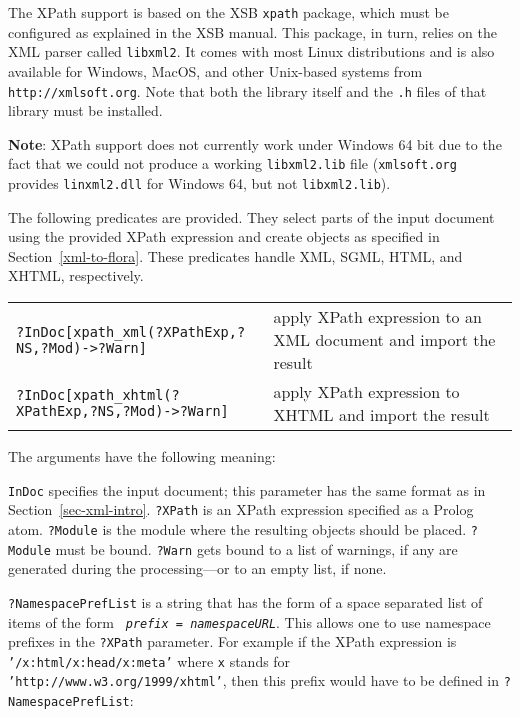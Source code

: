 The XPath support is based on the XSB {\tt xpath} package, which must be
configured as explained in the XSB manual. This package, in turn, relies on
the XML parser called {\tt libxml2}. It comes with most Linux
distributions and is also available for Windows, MacOS, and other
Unix-based systems from {\tt http://xmlsoft.org}. 
Note that both the library itself and the {\tt .h} files of that
library must be installed.

\textbf{Note}: XPath support does not currently work under Windows 64 bit
due to the fact that we could not produce a working
\texttt{libxml2.lib} file (\texttt{xmlsoft.org} provides
\texttt{linxml2.dll} for Windows 64, but not \texttt{libxml2.lib}).     

The following predicates are provided. They select parts of the input
document using the provided XPath expression and create \FLSYSTEM objects as
specified in Section~\ref{xml-to-flora}. These predicates handle XML, SGML,
HTML, and XHTML, respectively.

\begin{longtable}[l]{lp{6cm}}
{\tt ?InDoc[xpath\_xml(?XPathExp,?NS,?Mod)->?Warn]}&apply XPath expression to an XML
  document and import the result\\
{\tt ?InDoc[xpath\_xhtml(?XPathExp,?NS,?Mod)->?Warn]}&apply XPath expression
   to XHTML and import the result
  \end{longtable}
The arguments have the following meaning:

{\tt InDoc} specifies the input document; this parameter has the same
format as in Section~\ref{sec-xml-intro}. {\tt ?XPath} is an XPath expression
specified as a Prolog atom. \texttt{?Module} is the module where the resulting
\FLSYSTEM objects should be placed. {\tt ?Module} must be bound. \texttt{?Warn}
gets bound to a list of warnings, if any are generated during the
processing---or to an empty list, if none.

{\tt ?NamespacePrefList} is a string that has the form of a
space separated list of items of the form {\tt
  \emph{prefix} = \emph{namespaceURL}}. This allows one to use namespace
prefixes in the \texttt{?XPath} parameter.
For example if the XPath expression is {\tt '/x:html/x:head/x:meta'}
where {\tt x} 
stands for {\tt 'http://www.w3.org/1999/xhtml'}, then this
prefix would have to be
defined in {\tt ?NamespacePrefList}:


